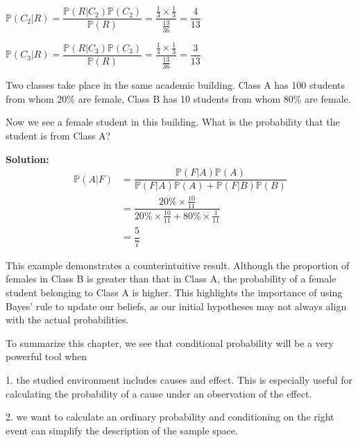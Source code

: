 \(\mathbb{P}(C_2 \vert R) = \dfrac{\mathbb{P}(R \vert C_2)\mathbb{P}(C_2)}{\mathbb{P}(R)} = \dfrac{\frac{1}{3} \times \frac{1}{3}}{\frac{13}{36}} = \dfrac{4}{13}\)

\(\mathbb{P}(C_3 \vert R) = \dfrac{\mathbb{P}(R \vert C_3)\mathbb{P}(C_3)}{\mathbb{P}(R)} = \dfrac{\frac{1}{4} \times \frac{1}{3}}{\frac{13}{36}} = \dfrac{3}{13}\)

\begin{eg}
    Two classes take place in the same academic building. Class A has 100 students from whom 20\% are female, Class B has 10 students from whom 80\% are female. 

    Now we see a female student in this building. What is the probability that the student is from Class A? 

    \textbf{Solution:} 
    \[
    \begin{aligned}
        \mathbb{P}(A \vert F) &= \dfrac{\mathbb{P}(F \vert A)\mathbb{P}(A)}{\mathbb{P}(F \vert A)\mathbb{P}(A) + \mathbb{P}(F \vert B)\mathbb{P}(B)} \\
        &= \dfrac{20\% \times \frac{10}{11}}{20\% \times \frac{10}{11} + 80\% \times \frac{1}{11}} \\
        & = \dfrac{5}{7} 
    \end{aligned} 
    \]
\end{eg}

This example demonstrates a counterintuitive result. Although the proportion of females in Class B is greater than that in Class A, the probability of a female student belonging to Class A is higher. This highlights the importance of using Bayes' rule to update our beliefs, as our initial hypotheses may not always align with the actual probabilities.

To summarize this chapter, we see that conditional probability will be a very powerful tool when

1. the studied environment includes causes and effect. This is especially useful for calculating the probability of a cause under an observation of the effect. 

2. we want to calculate an ordinary probability and conditioning on the right event can simplify the description of the sample space. 

